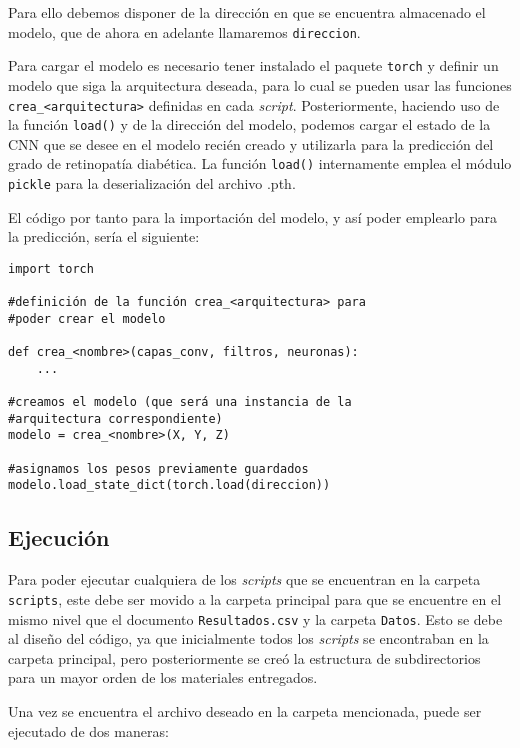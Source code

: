 \begin{itemize}
Para ello debemos disponer de la dirección en que se encuentra almacenado el modelo, que de ahora en adelante llamaremos \texttt{direccion}.

Para cargar el modelo es necesario tener instalado el paquete \texttt{torch} y definir un modelo que siga la arquitectura deseada, para lo cual se pueden usar las funciones \texttt{crea\_<arquitectura>} definidas en cada \textit{script}. Posteriormente, haciendo uso de la función \texttt{load()} y de la dirección del modelo, podemos cargar el estado de la CNN que se desee en el modelo recién creado y utilizarla para la predicción del grado de retinopatía diabética. La función \texttt{load()} internamente emplea el módulo \texttt{pickle} para la deserialización del archivo .pth.

El código por tanto para la importación del modelo, y así poder emplearlo para la predicción, sería el siguiente:

\begin{verbatim}
import torch

#definición de la función crea_<arquitectura> para 
#poder crear el modelo

def crea_<nombre>(capas_conv, filtros, neuronas):
    ...

#creamos el modelo (que será una instancia de la
#arquitectura correspondiente)
modelo = crea_<nombre>(X, Y, Z)

#asignamos los pesos previamente guardados
modelo.load_state_dict(torch.load(direccion))
\end{verbatim}

\subsection{Ejecución}

Para poder ejecutar cualquiera de los \textit{scripts} que se encuentran en la carpeta \texttt{scripts}, este debe ser movido a la carpeta principal para que se encuentre en el mismo nivel que el documento \texttt{Resultados.csv} y la carpeta \texttt{Datos}. Esto se debe al diseño del código, ya que inicialmente todos los \textit{scripts} se encontraban en la carpeta principal, pero posteriormente se creó la estructura de subdirectorios para un mayor orden de los materiales entregados.

Una vez se encuentra el archivo deseado en la carpeta mencionada, puede ser ejecutado de dos maneras:


\end{itemize}
